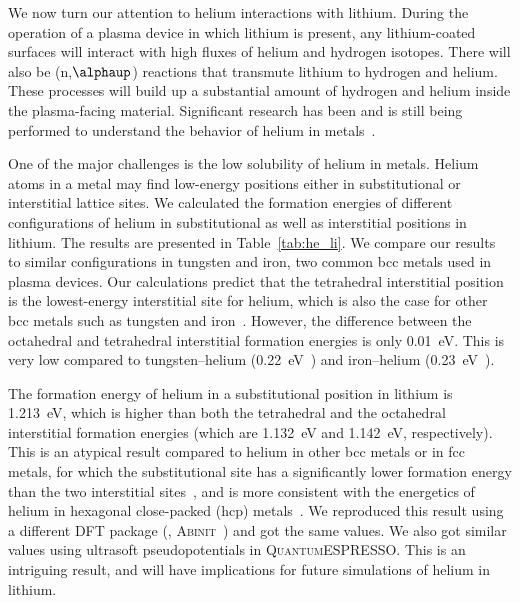 We now turn our attention to helium interactions with lithium.
During the operation of a plasma device in which lithium is present,
any lithium-coated surfaces will interact with high fluxes of helium and
hydrogen isotopes.
There will also be (n,$\alphaup$) reactions that transmute lithium to
hydrogen and helium. These processes will build up a substantial amount
of hydrogen and helium inside the plasma-facing material. Significant research
has been and is still being performed to understand the behavior of helium in
metals~\cite{Hammond2017c,hammond2020theoretical, samaras2009}. 

One of the major challenges is the low solubility of helium in metals. Helium
atoms in a metal may find low-energy positions either in substitutional or
interstitial lattice sites. We calculated the formation energies of different
configurations of helium in substitutional as well as interstitial positions
in lithium.
The results are presented in Table~\ref{tab:he_li}. We compare our results to
similar configurations in tungsten and iron, two common bcc metals used in
plasma devices. Our calculations predict that the
tetrahedral interstitial position is the lowest-energy interstitial site for
helium, which is also the case for other bcc metals such as tungsten and
iron~\cite{Becquart2006,fu2005}. However, the difference between the octahedral
and tetrahedral interstitial formation energies is only 0.01~eV\@.
This is very low compared to tungsten--helium (0.22~eV~\cite{Becquart2006})
and iron--helium (0.23~eV~\cite{seletskaia2005magnetic})\@.

The formation energy of helium in a substitutional position in lithium is
1.213~eV, which is higher than both the tetrahedral and the octahedral
interstitial formation energies (which are 1.132~eV and 1.142~eV,
respectively).
This is an atypical result compared to helium in other bcc metals or
in fcc metals, for which the substitutional site has a significantly lower
formation energy than the two interstitial
sites~\cite{Becquart2006,seletskaia2005magnetic,Seletskaia2008,Liao2020},
and is more consistent with the energetics of helium in hexagonal close-packed
(hcp) metals~\cite{Yang2011a,Yang2011b}. 
We reproduced this result using a different DFT package
(\ie, \textsc{Abinit}~\cite{Gonze2020,Romero2020})
and got the same values. We also got similar values using ultrasoft
pseudopotentials in \textsc{QuantumESPRESSO}\@.
This is an intriguing result, and will have implications for future simulations
of helium in lithium.


